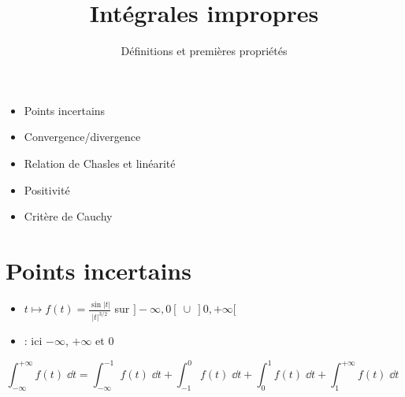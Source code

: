 







\title{{\bf Intégrales impropres}}
\subtitle{Définitions et premières propriétés}

\begin{frame}
  
  \debutmontitre

  \pause

{\footnotesize
\hfill
{}
\begin{minipage}{0.6\textwidth}
  \begin{itemize}
    \item<3-> Points incertains
    \item<4-> Convergence/divergence
    \item<5-> Relation de Chasles et linéarité
    \item<6-> Positivité
    \item<7-> Critère de Cauchy
  \end{itemize}
\end{minipage}
}

\end{frame}

\setcounter{framenumber}{0}

\section*{Points incertains}

\begin{frame}

\begin{itemize}
\item $t\mapsto f(t) = \frac{\sin |t|}{|t|^{3/2}}$ \quad sur  \quad
$]-\infty,0[ \ \cup\ ]0,+\infty[$


\pause

\item {} : ici $-\infty$, $+\infty$ et $0$  

\end{itemize}

\pause
$$
\int_{-\infty}^{+\infty} f(t)\;\dd t
=
\int_{-\infty}^{-1} f(t)\;\dd t+
\int_{-1}^{0} f(t)\;\dd t+
\int_{0}^{1} f(t)\;\dd t+
\int_{1}^{+\infty} f(t)\;\dd t\;
$$


\end{frame}

